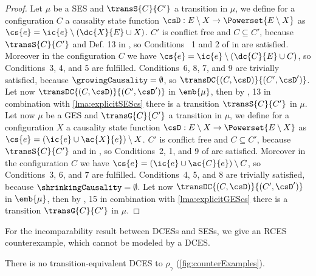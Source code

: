 \documentclass[runningheads,a4paper]{llncs}
\begin{document}
\begin{proof}
Let $\mu$ be a SES and $\transS{C}{C'}$ a transition in $\mu$, we define for a configuration $C$ a causality state function $\csD:E\setminus X\rightarrow\Powerset{E\setminus X}$ as $\cs{e}=\ic{e}\setminus(\dc{X}{E}\cup X)$. 
$C'$ is conflict free and $C\subseteq C'$, because $\transS{C}{C'}$ and Def. 13 in \cite{dynamicCausality15}, so Conditions~
1 and 2 of  in \cite{dynamicCausality15} are satisfied. Moreover in the configuration $C$ we have $\cs{e}=\ic{e}\setminus(\dc{C}{E}\cup C)$, so Conditions~3, 4, and 5 are fulfilled. Conditions~6, 8, 7, and 9 are trivially satisfied, because $\growingCausality=\emptyset$, so $\transDC{(C,\csD)}{(C',\csD')}$.
Let now $\transDC{(C,\csD)}{(C',\csD')}$ in $\emb{\mu}$, then by , 13 in combination with \lem\ref{lma:explicitSEScs} there is a transition $\transS{C}{C'}$ in $\mu$.\\
Let now $\mu$ be a GES and $\transG{C}{C'}$ a transition in $\mu$, we define for a configuration $X$ a causality state function $\csD:E\setminus X\rightarrow\Powerset{E\setminus X}$ as $\cs{e}=(\ic{e}\cup\ac{X}{e})\setminus X$. $C'$ is conflict free and $C\subseteq C'$, because $\transS{C}{C'}$ and  in \cite{dynamicCausality15}, so Conditions~2, 1,  and 9 of  are satisfied. Moreover in the configuration $C$ we have $\cs{e}=(\ic{e}\cup\ac{C}{e})\setminus C$, so Conditions~3, 6, and 7 are fulfilled. Conditions~4, 5, and 8 are trivially satisfied, because $\shrinkingCausality=\emptyset$.
Let now $\transDC{(C,\csD)}{(C',\csD')}$ in $\emb{\mu}$, then by , 15 in combination with \lem\ref{lma:explicitGEScs} there is a transition $\transG{C}{C'}$ in $\mu$. 
\end{proof}

For the incomparability result between DCESs and SESs, we give an RCES
counterexample, which cannot be modeled by a DCES.

\begin{lemma}\label{lma:RCESNotinDCES}
There is no transition-equivalent DCES to $\rho_{\gamma}$ (\cf \fig\ref{fig:counterExamples}).
\end{lemma}
\end{document}
